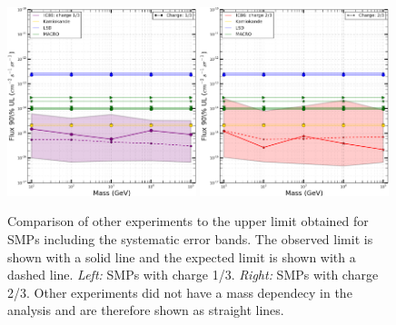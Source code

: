 \begin{figure}
\centering
\includegraphics[width=0.49\textwidth]{chapter8/img/UpperLimitPlot_masses_withunc_0p333333333333}
\includegraphics[width=0.49\textwidth]{chapter8/img/UpperLimitPlot_masses_withunc_0p666666666667}
\caption{Comparison of other experiments to the upper limit obtained for SMPs including the systematic error bands. The observed limit is shown with a solid line and the expected limit is shown with a dashed line. \textit{Left: }SMPs with charge 1/3. \textit{Right: }SMPs with charge 2/3. Other experiments did not have a mass dependecy in the analysis and are therefore shown as straight lines.}
\label{fig:moneyplot2}
\end{figure}
